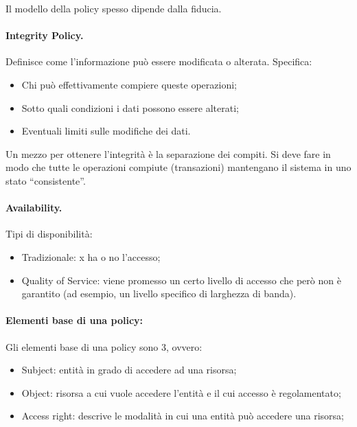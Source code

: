 Il modello della policy spesso dipende dalla fiducia.

\paragraph{Integrity Policy.}

Definisce come l'informazione può essere modificata o alterata.
Specifica:
\begin{itemize}
      \item Chi può effettivamente compiere queste operazioni;
      \item Sotto quali condizioni i dati possono essere alterati;
      \item Eventuali limiti sulle modifiche dei dati.
\end{itemize}

Un mezzo per ottenere l'integrità è la separazione dei compiti.
Si deve fare in modo che tutte le operazioni compiute (transazioni) mantengano il sistema in uno
stato ``consistente''.

\paragraph{Availability.}

Tipi di disponibilità:
\begin{itemize}
      \item Tradizionale: x ha o no l'accesso;
      \item Quality of Service: viene promesso un certo livello di accesso
            che però non è garantito (ad esempio, un livello
            specifico di larghezza di banda).
\end{itemize}

\paragraph{Elementi base di una policy:}
Gli elementi base di una policy sono 3, ovvero:
\begin{itemize}
	\item Subject: entità in grado di accedere ad una risorsa;
	\item Object: risorsa a cui vuole accedere l'entità e il cui accesso è regolamentato;
	\item Access right: descrive le modalità in cui una entità può accedere una risorsa;
\end{itemize}

